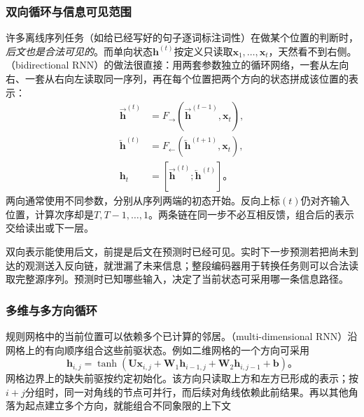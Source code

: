 \subsubsection{双向循环与信息可见范围}
\label{sec:rnn-bidirectional}

许多离线序列任务（如给已经写好的句子逐词标注词性）在做某个位置的判断时，\emph{后文也是合法可见的}。而单向状态$\bm h^{(t)}$按定义只读取$\bm x_1,\ldots,\bm x_t$，天然看不到右侧。（bidirectional RNN）的做法很直接：用两套参数独立的循环网络，一套从左向右、一套从右向左读取同一序列，再在每个位置把两个方向的状态拼成该位置的表示：
\begin{equation}
  \begin{aligned}
    \overrightarrow{\bm{h}}^{(t)}&=F_{\rightarrow}\!\left(
       \overrightarrow{\bm{h}}^{(t-1)},\bm{x}_t\right),\\
    \overleftarrow{\bm{h}}^{(t)}&=F_{\leftarrow}\!\left(
       \overleftarrow{\bm{h}}^{(t+1)},\bm{x}_t\right),\\
    \bm{h}_t&=[\overrightarrow{\bm{h}}^{(t)};
                 \overleftarrow{\bm{h}}^{(t)}]\text{。}
  \end{aligned}
  \label{eq:rnn-bidirectional}
\end{equation}
两向通常使用不同参数，分别从序列两端的初态开始。反向上标$(t)$仍对齐输入位置，计算次序却是$T,T-1,\ldots,1$。两条链在同一步不必互相反馈，组合后的表示交给读出或下一层。

双向表示能使用后文，前提是后文在预测时已经可见。实时下一步预测若把尚未到达的观测送入反向链，就泄漏了未来信息；整段编码器用于转换任务则可以合法读取完整源序列。预测时已知哪些输入，决定了当前状态可采用哪一条信息路径。

\subsubsection{多维与多方向循环}
\label{sec:rnn-multidimensional}

规则网格中的当前位置可以依赖多个已计算的邻居。（multi-dimensional RNN）沿网格上的有向顺序组合这些前驱状态。例如二维网格的一个方向可采用
\begin{equation}
  \bm{h}_{i,j}=\tanh\!\left(
     \bm{U}\bm{x}_{i,j}+\bm{W}_1\bm{h}_{i-1,j}
      +\bm{W}_2\bm{h}_{i,j-1}+\bm{b}\right)\text{。}
  \label{eq:rnn-multidimensional}
\end{equation}
网格边界上的缺失前驱按约定初始化。该方向只读取上方和左方已形成的表示；按$i+j$分组时，同一对角线的节点可并行，而后续对角线依赖此前结果。再以其他角落为起点建立多个方向，就能组合不同象限的上下文

